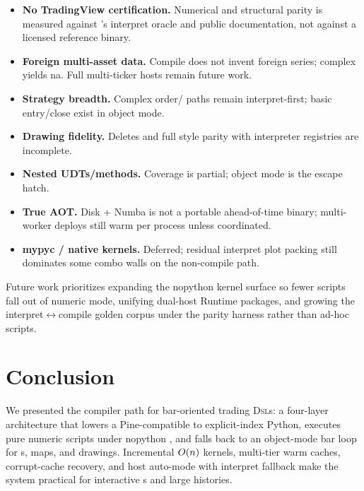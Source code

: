 \documentclass[11pt,a4paper]{article}
\renewcommand{\na}{\textsf{na}}
\begin{document}
\begin{itemize}[leftmargin=*]
  \item \textbf{No TradingView certification.} Numerical and structural
        parity is measured against \pyne{}'s interpret oracle and public
        documentation, not against a licensed reference binary.
  \item \textbf{Foreign multi-asset data.} Compile does not invent foreign
        series; complex  yields \na{}. Full multi-ticker
        hosts remain future work.
  \item \textbf{Strategy breadth.} Complex order/ paths
        remain interpret-first; basic entry/close exist in object mode.
  \item \textbf{Drawing fidelity.} Deletes and full style parity with
        interpreter registries are incomplete.
  \item \textbf{Nested UDTs/methods.} Coverage is partial; object mode is the
        escape hatch.
  \item \textbf{True AOT.} Disk + Numba  is not a portable
        ahead-of-time binary; multi-worker deploys still warm per process
        unless coordinated.
  \item \textbf{mypyc / native kernels.} Deferred; residual interpret plot
        packing still dominates some combo walls on the non-compile path.
\end{itemize}

Future work prioritizes expanding the nopython kernel surface so fewer
scripts fall out of numeric mode, unifying dual-host Runtime packages, and
growing the interpret$\leftrightarrow$compile golden corpus under the parity
harness rather than ad-hoc scripts.

\section{Conclusion}
\label{sec:concl}

We presented the \pyne{} \numba{} compiler path for bar-oriented trading
\textsc{Dsl}s: a four-layer architecture that lowers a Pine-compatible \ast{}
to explicit-index Python, executes pure numeric scripts under \numba{}
nopython \jit{}, and falls back to an object-mode bar loop for \udt{}s, maps,
and drawings. Incremental $O(n)$ kernels, multi-tier warm \ir{} caches,
corrupt-cache recovery, and host auto-mode with interpret fallback make the
system practical for interactive \api{}s and large histories.
\end{document}
